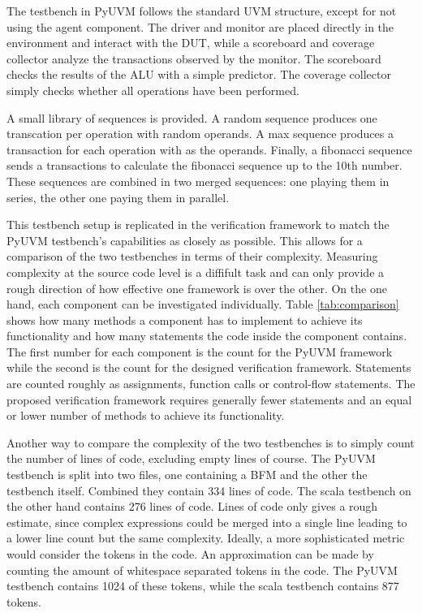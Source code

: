 The testbench in PyUVM follows the standard UVM structure, except for not using the agent component. The driver and
monitor are placed directly in the environment and interact with the DUT, while a scoreboard and coverage collector
analyze the transactions observed by the monitor. The scoreboard checks the results of the ALU with a simple
predictor. The coverage collector simply checks whether all operations have been performed.

A small library of sequences is provided. A random sequence produces one transcation per operation with random
operands. A max sequence produces a transaction for each operation with  as the operands. Finally, a
fibonacci sequence sends a transactions to calculate the fibonacci sequence up to the 10th number. These sequences
are combined in two merged sequences: one playing them in series, the other one paying them in parallel.

This testbench setup is replicated in the verification framework to match the PyUVM testbench's capabilities as
closely as possible. This allows for a comparison of the two testbenches in terms of their complexity. Measuring
complexity at the source code level is a diffifult task and can only provide a rough direction of how effective one
framework is over the other. On the one hand, each component can be investigated individually. Table
\ref{tab:comparison} shows how many methods a component has to implement to achieve its functionality and how many
statements the code inside the component contains. The first number for each component is the count for the PyUVM
framework while the second is the count for the designed verification framework. Statements are counted roughly as
assignments, function calls or control-flow statements. The proposed verification framework requires generally fewer
statements and an equal or lower number of methods to achieve its functionality.

Another way to compare the complexity of the two testbenches is to simply count the number of lines of code,
excluding empty lines of course. The PyUVM testbench is split into two files, one containing a BFM and the other the
testbench itself. Combined they contain 334 lines of code. The scala testbench on the other hand contains 276 lines
of code. Lines of code only gives a rough estimate, since complex expressions could be merged into a single line
leading to a lower line count but the same complexity. Ideally, a more sophisticated metric would consider the tokens
in the code. An approximation can be made by counting the amount of whitespace separated tokens in the code. The
PyUVM testbench contains 1024 of these tokens, while the scala testbench contains 877 tokens.

